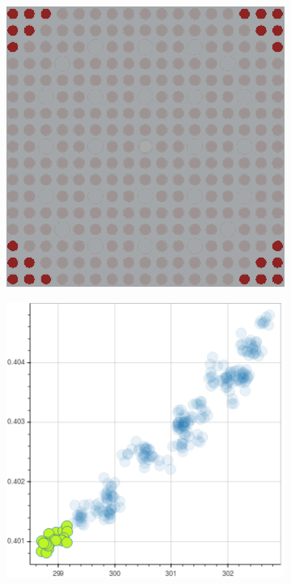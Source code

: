 \begin{figure}[h!]
\begin{subfigure}{0.45\textwidth}
  \caption{}
  \label{fig:chap10-fiss-mean-react-frac-mgxs}
\end{subfigure}
\begin{subfigure}{0.45\textwidth}
  \centering
  \includegraphics[width=0.9\linewidth]{figures/unsupervised/features/assm-16/u235-fiss/mean-react-frac/geometry-2}
  \caption{}
  \label{fig:chap10-fiss-mean-react-frac-geom-2}
\end{subfigure}%
\begin{subfigure}{0.45\textwidth}
  \centering
  \includegraphics[width=0.9\linewidth]{figures/unsupervised/features/assm-16/u235-fiss/mean-react-frac/mgxs-2}

\end{subfigure}
\end{figure}

